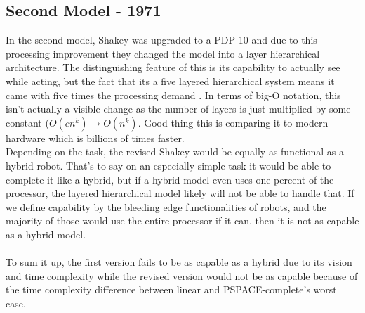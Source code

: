 \documentclass{article}
\newcommand\tab[1][1cm]{\hspace*{#1}}
\begin{document}
\subsection*{Second Model - 1971}
In the second model, Shakey was upgraded to a PDP-10 and due to this processing
improvement they changed the model into a layer hierarchical architecture. The
distinguishing feature of this is its capability to actually see while acting,
but the fact that its a five layered hierarchical system means it came with five
times the processing demand \cite{shakey}. In terms of big-O notation, this
isn't actually a visible change as the number of layers is just multiplied by
some constant ($O(cn^k) \rightarrow O(n^k)$. Good thing this is comparing it to
modern hardware which is billions of times faster. \\  
\tab Depending on the task, the revised Shakey would be equally as functional as a
hybrid robot. That's to say on an especially simple task it would be able to
complete it like a hybrid, but if a hybrid model even uses one percent of the
processor, the layered hierarchical model likely will not be able to handle
that. If we define capability by the bleeding edge functionalities of robots,
and the majority of those would use the entire processor if it can, then it
is not as capable as a hybrid model. \\ \\
\tab To sum it up, the first version fails to be as capable as a hybrid due to
its vision and time complexity while the revised version would not be as capable
because of the time complexity difference between linear and PSPACE-complete's
worst case.
\newpage



\end{document}
